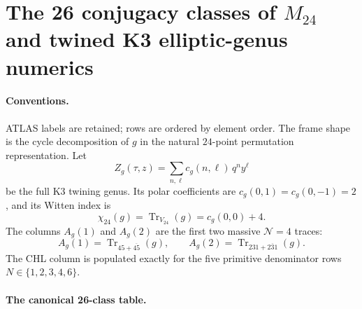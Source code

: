 
\providecommand{\kBKM}{\kappa_{\mathrm{BKM}}}
\providecommand{\CM}{C_{M_{24}}}

\section*{The 26 conjugacy classes of $M_{24}$ and twined K3
elliptic-genus numerics}

\paragraph{Conventions.} ATLAS labels are retained; rows are ordered by
element order. The frame shape is the cycle decomposition of \(g\) in the
natural \(24\)-point permutation representation. Let
\[
  Z_g(\tau,z)=\sum_{n,\ell}c_g(n,\ell)\,q^n y^\ell
\]
be the full K3 twining genus. Its polar coefficients are
\(c_g(0,1)=c_g(0,-1)=2\), and its Witten index is
\[
  \chi_{24}(g)=\operatorname{Tr}_{V_{24}}(g)
  =c_g(0,0)+4 .
\]
The columns \(A_g(1)\) and \(A_g(2)\) are the first two massive
\(\mathcal N=4\) traces:
\[
  A_g(1)=\operatorname{Tr}_{45+\overline{45}}(g),\qquad
  A_g(2)=\operatorname{Tr}_{231+\overline{231}}(g).
\]
The CHL column is populated exactly for the five primitive denominator
rows \(N\in\{1,2,3,4,6\}\).

\paragraph{The canonical 26-class table.}


